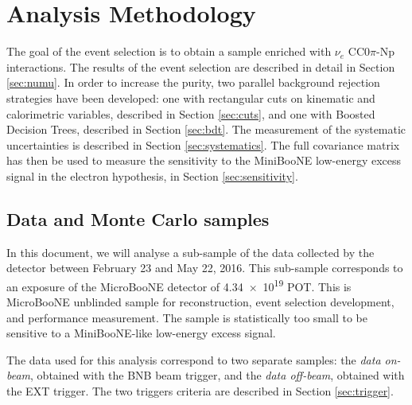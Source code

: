 \section{Analysis Methodology}
\label{sec:methodology}
The goal of the event selection is to obtain a sample enriched with $\nu_{e}$ CC0$\pi$-Np interactions. The results of the event selection are described in detail in Section \ref{sec:numu}. In order to increase the purity, two parallel background rejection strategies have been developed: one with rectangular cuts on kinematic and calorimetric variables, described in Section \ref{sec:cuts}, and one with Boosted Decision Trees, described in Section \ref{sec:bdt}.
The measurement of the systematic uncertainties is described in Section \ref{sec:systematics}. The full covariance matrix has then be used to measure the sensitivity to the MiniBooNE low-energy excess signal in the electron hypothesis, in Section \ref{sec:sensitivity}.

\subsection{Data and Monte Carlo samples}\label{sec:data}
In this document, we will analyse a sub-sample of the data collected by the detector between February 23 and May 22, 2016. This sub-sample corresponds to an exposure of the MicroBooNE detector of \num{4.34e19} POT. This is MicroBooNE unblinded sample for reconstruction, event selection development, and performance measurement. The sample is statistically too small to be sensitive to a MiniBooNE-like low-energy excess signal. 

The data used for this analysis correspond to two separate samples: the \emph{data on-beam}, obtained with the BNB beam trigger, and the \emph{data off-beam}, obtained with the EXT trigger. The two triggers criteria are described in Section \ref{sec:trigger}.

